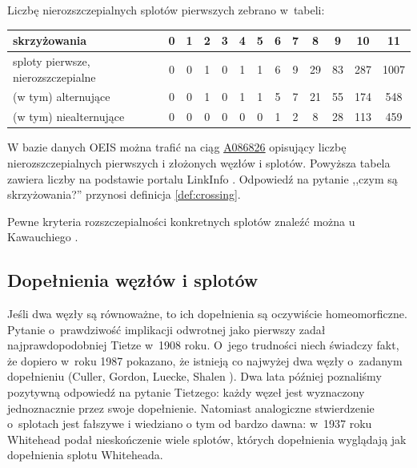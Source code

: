 Liczbę nierozszczepialnych splotów pierwszych zebrano w~tabeli:

\renewcommand*{\arraystretch}{1.4}
\footnotesize
\begin{longtable}{lcccccccccccc}
    \hline
    \textbf{skrzyżowania} & 0 & 1 & 2 & 3 & 4 & 5 &  6 &  7 &  8 & 9 & 10 & 11 \\ \hline \endhead
    sploty pierwsze, nierozszczepialne & 0 & 0 & 1 & 0 & 1 & 1 & 6 & 9 & 29 & 83 & 287 & 1007 \\
    (w tym) alternujące & 0 & 0 & 1 & 0 & 1 & 1 & 5 & 7 & 21 & 55 & 174 & 548 \\
    (w tym) niealternujące & 0 & 0 & 0 & 0 & 0 & 0 & 1 & 2 & 8 & 28 & 113 & 459 \\
    \hline
\end{longtable}
\normalsize

W bazie danych OEIS można trafić na ciąg \href{https://oeis.org/A086826}{A086826} opisujący liczbę nierozszczepialnych pierwszych i złożonych węzłów i splotów.
Powyższa tabela zawiera liczby na podstawie portalu LinkInfo \cite{linkinfo24}.
Odpowiedź na pytanie ,,czym są skrzyżowania?'' przynosi definicja \ref{def:crossing}.

Pewne kryteria rozszczepialności konkretnych splotów znaleźć można u Kawauchiego \cite[s. 36-38]{kawauchi1996}.

\subsection{Dopełnienia węzłów i splotów}

Jeśli dwa węzły są równoważne, to ich dopełnienia są oczywiście homeomorficzne.
Pytanie o~prawdziwość implikacji odwrotnej jako pierwszy zadał najprawdopodobniej Tietze \cite{tietze1908} w~1908 roku.
%
O~jego trudności niech świadczy fakt, że dopiero w~roku 1987 pokazano, że istnieją co najwyżej dwa węzły o~zadanym dopełnieniu (Culler, Gordon, Luecke, Shalen \cite{culler1987}).
%
%
%
%
Dwa lata później poznaliśmy pozytywną odpowiedź na pytanie Tietzego: każdy węzeł jest wyznaczony jednoznacznie przez swoje dopełnienie.
Natomiast analogiczne stwierdzenie o~splotach jest fałszywe i wiedziano o tym od bardzo dawna: w~1937 roku Whitehead \cite{whitehead1937} podał nieskończenie wiele splotów, których dopełnienia wyglądają jak dopełnienia splotu Whiteheada.

